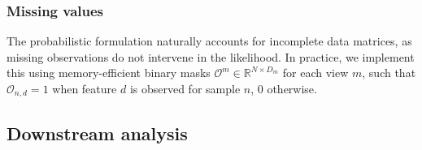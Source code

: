 \subsubsection{Missing values} \label{section:mofa_missing_values}

The probabilistic formulation naturally accounts for incomplete data matrices, as missing observations do not intervene in the likelihood. In practice, we implement this using memory-efficient binary masks $\mathcal{O}^m \in \mathbb{R}^{N\times D_m}$ for each view $m$, such that $\mathcal{O}_{n,d} = 1$ when feature $d$ is observed for sample $n$, 0 otherwise. 

\subsection{Downstream analysis} \label{mofa:downstream}

